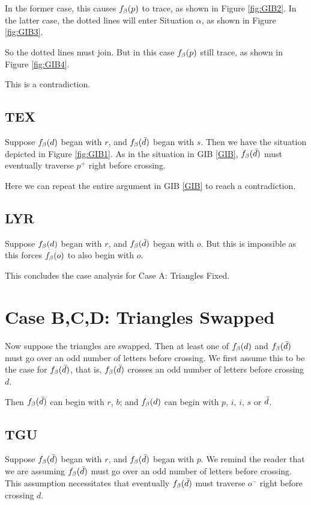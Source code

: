 In the former case, this causes $f_\beta(p)$ to trace, as shown in Figure \ref{fig:GIB2}. In the latter case, the dotted lines will enter Situation $\alpha$, as shown in Figure \ref{fig:GIB3}.

So the dotted lines must join. But in this case $f_\beta(p)$ still trace, as shown in Figure \ref{fig:GIB4}.

This is a contradiction.

\subsection{TEX}
Suppose $f_\beta(d)$ began with $r$, and $f_\beta(\bar{d})$ began with $s$. Then we have the situation depicted in Figure \ref{fig:GIB1}. As in the situation in GIB \ref{GIB}, $f_\beta(\bar{d})$ must eventually traverse $p^+$ right before crossing.

Here we can repeat the entire argument in GIB \ref{GIB} to reach a contradiction.

\subsection{LYR}
Suppose $f_\beta(d)$ began with $r$, and $f_\beta(\bar{d})$ began with $o$. But this is impossible as this forces $f_\beta(o)$ to also begin with $o$.

This concludes the case analysis for Case A: Triangles Fixed.

\section{Case B,C,D: Triangles Swapped}\label{CaseBCD Track 12}

Now suppose the triangles are swapped. Then at least one of $f_\beta(d)$ and $f_\beta(\bar{d})$ must go over an odd number of letters before crossing. We first assume this to be the case for $f_\beta(\bar{d})$, that is, $f_\beta(\bar{d})$ crosses an odd number of letters before crossing $d$.

Then $f_\beta(\bar{d})$ can begin with $r$, $b$; and $f_\beta(d)$ can begin with $p$, $i$, $i$, $s$ or $\bar{d}$.

\subsection{TGU}\label{TGU}
Suppose $f_\beta(\bar{d})$ began with $r$, and $f_\beta(\bar{d})$ began with $p$. We remind the reader that we are assuming $f_\beta(\bar{d})$ must go over an odd number of letters before crossing. This assumption necessitates that eventually $f_\beta(\bar{d})$ must traverse $o^-$ right before crossing $d$.

